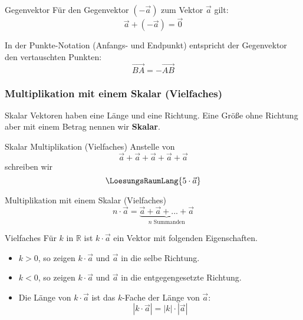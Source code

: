 \begin{bemerkung}{Gegenvektor}{}
  Für den Gegenvektor $(-\vec{a})$ zum Vektor $\vec{a}$ gilt:
  $$\vec{a} + (-\vec{a}) = \overrightarrow{0}$$
  
\end{bemerkung}


\begin{bemerkung}{}{}
  In der Punkte-Notation (Anfangs- und Endpunkt) entspricht der
  Gegenvektor  den vertauschten Punkten:
  $$\overrightarrow{BA} = - \overrightarrow{AB}$$
\end{bemerkung}


\newpage


\subsubsection{Multiplikation mit einem Skalar (Vielfaches)}
\begin{definition}{Skalar}{}
  Vektoren haben eine Länge und eine Richtung. Eine Größe ohne
  Richtung aber mit einem Betrag nennen wir \textbf{Skalar}. 
\end{definition}

\begin{beispiel}{Skalar Multiplikation (Vielfaches)}{}
  Anstelle von
  $$\vec{a}+\vec{a}+\vec{a}+\vec{a}+\vec{a}$$
  schreiben wir
  $$\LoesungsRaumLang{5\cdot{}\vec{a}}$$
\end{beispiel}

\begin{definition}{Multiplikation mit einem Skalar (Vielfaches)}{}
  $$n\cdot{}\vec{a} = \underbrace{\vec{a} + \vec{a} + ... + \vec{a}}_{n \text{ Summanden}}$$
\end{definition}


\begin{definition}{Vielfaches}{}
  Für $k$ in $\mathbb{R}$ ist $k\cdot{}\vec{a}$ ein Vektor mit
  folgenden Eigenschaften.

  \begin{itemize}
  \item $k>0$, so zeigen $k\cdot{}\vec{a}$ und $\vec{a}$ in die selbe Richtung.
  \item $k<0$, so zeigen $k\cdot{}\vec{a}$ und $\vec{a}$ in die entgegengesetzte Richtung.
  \item Die Länge von $k\cdot{}\vec{a}$ ist das $k$-Fache der Länge
    von $\vec{a}$: $$|k\cdot{}\vec{a}| = |k|\cdot{}|\vec{a}|$$
   \end{itemize}
\end{definition}


